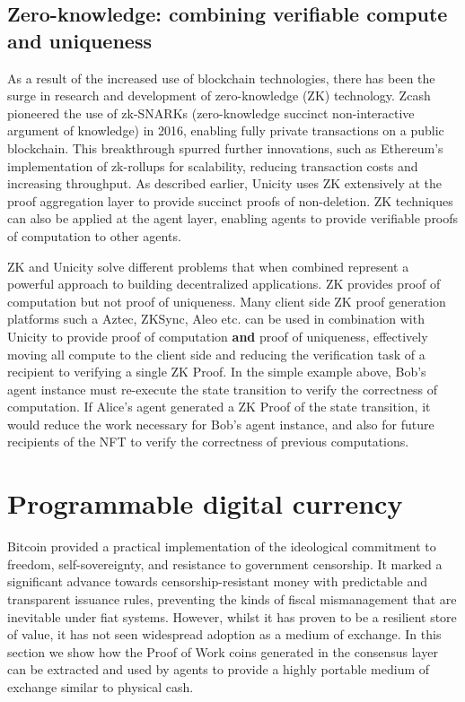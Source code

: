 \documentclass{article}
\begin{document}
\subsection{Zero-knowledge: combining verifiable compute and  uniqueness}

As a result of the increased use of blockchain technologies, there has been the surge in research and development of zero-knowledge (ZK) technology. Zcash pioneered the use of zk-SNARKs (zero-knowledge succinct non-interactive argument of knowledge) in 2016, enabling fully private transactions on a public blockchain. This breakthrough spurred further innovations, such as Ethereum's implementation of zk-rollups for scalability, reducing transaction costs and increasing throughput. As described earlier, Unicity uses ZK extensively at the proof aggregation layer to provide succinct proofs of non-deletion. ZK techniques can also be applied at the agent layer, enabling agents to provide verifiable proofs of computation to other agents.

ZK and Unicity solve different problems that when combined represent a powerful approach to building decentralized applications. ZK provides proof of computation but not proof of uniqueness. Many client side ZK proof generation platforms such a Aztec, ZKSync, Aleo etc. can be used in combination with Unicity to provide proof of computation \textbf{and} proof of uniqueness, effectively moving all compute to the client side and reducing the verification task of a recipient to verifying a single ZK Proof. In the simple example above, Bob's agent instance must re-execute the state transition to verify the correctness of computation. If Alice's agent generated a ZK Proof of the state transition, it would reduce the work necessary for Bob's agent instance, and also for future recipients of the NFT to verify the correctness of previous computations.


\section{Programmable digital currency}

Bitcoin provided a practical implementation of the ideological commitment to freedom, self-sovereignty, and resistance to government censorship.  It marked a significant advance towards censorship-resistant money with predictable and transparent issuance rules, preventing the kinds of fiscal mismanagement that are inevitable under fiat systems. However, whilst it has proven to be a resilient store of value, it has not seen widespread adoption as a medium of exchange. In this section we show how the Proof of Work coins generated in the consensus layer can be extracted and used by agents to provide a highly portable medium of exchange similar to physical cash.
\end{document}
